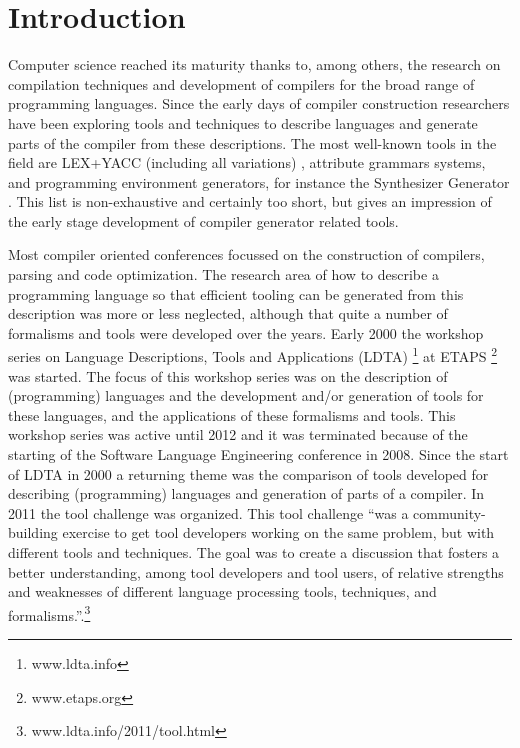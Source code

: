 \documentclass[english,preprint,12pt]{elsarticle}
\begin{document}

\section{Introduction}
\label{sec:intro}

Computer science reached its maturity thanks to, among others, the research on compilation techniques
and development of compilers for the broad range of programming languages. 
Since the early days of compiler construction researchers have been exploring tools and techniques to 
describe languages and generate parts of the compiler from these descriptions. 
The most well-known tools in the field are LEX+YACC (including
all variations) \cite{Lesk1990, Joh75.yacc}, attribute grammars systems, and programming environment
generators, for instance the Synthesizer Generator \cite{Reps1989}. This list is non-exhaustive and
certainly too short, but gives an impression of the early stage development of compiler generator related tools. 

Most compiler oriented conferences focussed on the construction of compilers, parsing and code optimization.
The research area of how to describe a programming language so that efficient tooling can be generated from
this description was more or less neglected, although that quite a number of formalisms and tools were developed
over the years.
Early 2000 the workshop series on Language Descriptions, Tools and Applications (LDTA) \footnote{www.ldta.info} 
at ETAPS \footnote{www.etaps.org} was started. 
The focus of this workshop series was on the description of (programming) languages and
the development and/or generation of tools for these languages, and the applications of these formalisms
and tools. 
This workshop series was active until 2012 and it was terminated because of the starting of the
Software Language Engineering conference in 2008. Since the start of LDTA in 2000 a returning theme
was the comparison of tools developed for describing (programming) languages and generation of
parts of a compiler. In 2011 the tool challenge was organized. This tool challenge
``was a community-building exercise to get tool developers working on the same problem, but with 
different tools and techniques. The goal was to create a discussion that fosters a better understanding, 
among tool developers and tool users, of relative strengths and weaknesses of different language 
processing tools, techniques, and formalisms.''.\footnote{www.ldta.info/2011/tool.html}
\end{document}
